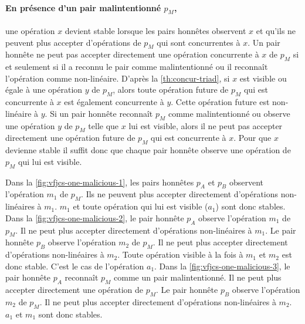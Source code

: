 \paragraph{En présence d'un pair malintentionné $p_M$,}
une opération $x$ devient stable lorsque les pairs honnêtes observent $x$ et qu'ils ne peuvent plus accepter d'opérations de $p_M$ qui sont concurrentes à $x$.
Un pair honnête ne peut pas accepter directement une opération concurrente à $x$ de $p_M$ si et seulement si il a reconnu le pair comme malintentionné ou il reconnaît l'opération comme non-linéaire.
D'après la \autoref{th:concur-triad}, si $x$ est visible ou égale à une opération $y$ de $p_M$, alors toute opération future de $p_M$ qui est concurrente à $x$ est également concurrente à $y$.
Cette opération future est non-linéaire à $y$.
Si un pair honnête reconnaît $p_M$ comme malintentionné ou observe une opération $y$ de $p_M$ telle que $x$ lui est visible, alors il ne peut pas accepter directement une opération future de $p_M$ qui est concurrente à $x$.
Pour que $x$ devienne stable il suffit donc que chaque pair honnête observe une opération de $p_M$ qui lui est visible.

Dans la \autoref{fig:vfjcs-one-malicious-1}, les pairs honnêtes $p_A$ et $p_B$ observent l'opération $m_1$ de $p_M$.
Ils ne peuvent plus accepter directement d'opérations non-linéaires à $m_1$.
$m_1$ et toute opération qui lui est visible ($a_1$) sont donc stables.
Dans la \autoref{fig:vfjcs-one-malicious-2}, le pair honnête $p_A$ observe l'opération $m_1$ de $p_M$.
Il ne peut plus accepter directement d'opérations non-linéaires à $m_1$.
Le pair honnête  $p_B$ observe l'opération $m_2$ de $p_M$.
Il ne peut plus accepter directement d'opérations non-linéaires à $m_2$.
Toute opération visible à la fois à $m_1$ et $m_2$ est donc stable.
C'est le cas de l'opération $a_1$.
Dans la \autoref{fig:vfjcs-one-malicious-3}, le pair honnête $p_A$ reconnaît $p_M$ comme un pair malintentionné.
Il ne peut plus accepter directement une opération de $p_M$.
Le pair honnête  $p_B$ observe l'opération $m_2$ de $p_M$.
Il ne peut plus accepter directement d'opérations non-linéaires à $m_2$.
$a_1$ et $m_1$ sont donc stables.


